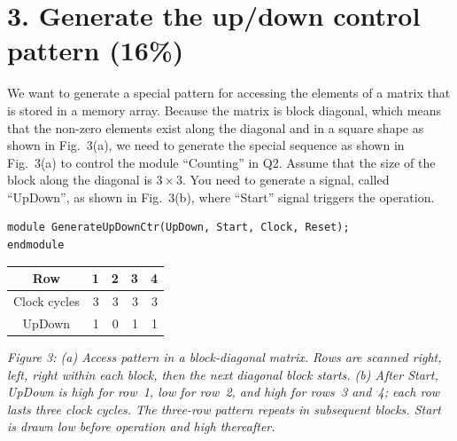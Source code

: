 \documentclass[11pt,a4paper]{article}
\begin{document}
\section*{3. Generate the up/down control pattern (16\%)}
We want to generate a special pattern for accessing the elements of a matrix that is stored in a memory array. Because the matrix is block diagonal, which means that the non-zero elements exist along the diagonal and in a square shape as shown in Fig.~3(a), we need to generate the special sequence as shown in Fig.~3(a) to control the module ``Counting'' in Q2. Assume that the size of the block along the diagonal is $3\times3$. You need to generate a signal, called ``UpDown'', as shown in Fig.~3(b), where ``Start'' signal triggers the operation.
\par\medskip\noindent\begin{minipage}{\linewidth}
\begin{lstlisting}
module GenerateUpDownCtr(UpDown, Start, Clock, Reset);
endmodule
\end{lstlisting}
\end{minipage}\par
\begin{center}
\qquad
\begin{tabular}{crrrr}
\toprule
Row & 1 & 2 & 3 & 4\\
\midrule
Clock cycles & 3 & 3 & 3 & 3\\
UpDown & 1 & 0 & 1 & 1\\
\bottomrule
\end{tabular}
\end{center}
\textit{Figure 3: (a) Access pattern in a block-diagonal matrix. Rows are scanned right, left, right within each block, then the next diagonal block starts. (b) After Start, UpDown is high for row~1, low for row~2, and high for rows~3 and~4; each row lasts three clock cycles. The three-row pattern repeats in subsequent blocks. Start is drawn low before operation and high thereafter.}
\end{document}
